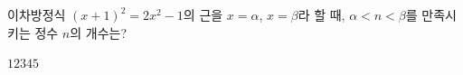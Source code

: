 이차방정식 $(x+1)^2=2x^2-1$의 근을 $x=\alpha$, $x=\beta$라 할 때, $\alpha<n<\beta$를 만족시키는 정수 $n$의 개수는? \cond{$\alpha<\beta$}
\begin{choices32}{$1$}{$2$}{$3$}{$4$}{$5$}\end{choices32}
